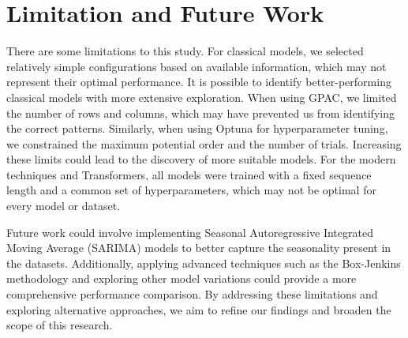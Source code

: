 \documentclass[sn-mathphys-num]{sn-jnl}
\theoremstyle{thmstyleone}%
\theoremstyle{thmstyletwo}%
\theoremstyle{thmstylethree}%
\begin{document}
\section{Limitation and Future Work}
There are some limitations to this study. For classical models, we selected relatively simple configurations based on available information, which may not represent their optimal performance. It is possible to identify better-performing classical models with more extensive exploration. When using GPAC, we limited the number of rows and columns, which may have prevented us from identifying the correct patterns. Similarly, when using Optuna for hyperparameter tuning, we constrained the maximum potential order and the number of trials. Increasing these limits could lead to the discovery of more suitable models. For the modern techniques and Transformers, all models were trained with a fixed sequence length and a common set of hyperparameters, which may not be optimal for every model or dataset.

Future work could involve implementing Seasonal Autoregressive Integrated Moving Average (SARIMA) \cite{box2015time} models to better capture the seasonality present in the datasets. Additionally, applying advanced techniques such as the Box-Jenkins \cite{box2015time} methodology and exploring other model variations could provide a more comprehensive performance comparison. By addressing these limitations and exploring alternative approaches, we aim to refine our findings and broaden the scope of this research.





\end{document}
